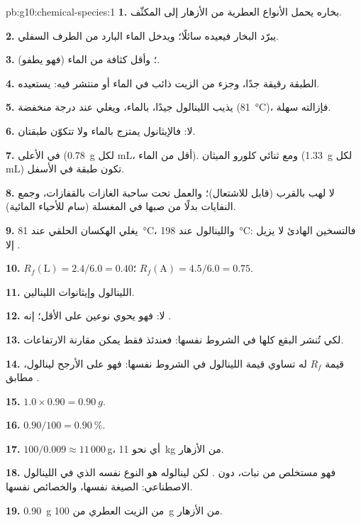 \begin{solution}{pb:g10:chemical-species:1}
\textbf{1.} بخاره يحمل الأنواع العطرية من الأزهار إلى
المكثّف.

\textbf{2.} يبرّد البخار فيعيده سائلًا؛ ويدخل الماء البارد من الطرف
السفلي.

\textbf{3.} ؛ وأقل كثافة من الماء (فهو يطفو).

\textbf{4.} الطبقة رقيقة جدًا، وجزء من الزيت ذائب في الماء أو منتشر فيه:
 يستعيده.

\textbf{5.} يذيب اللينالول جيدًا،  بالماء، ويغلي عند درجة
منخفضة (\qty{81}{\celsius})، فإزالته سهلة.

\textbf{6.} لا: فالإيثانول يمتزج بالماء ولا تتكوّن طبقتان.

\textbf{7.} في الأعلى (\qty{0.78}{g} لكل mL، أقل من الماء). ومع ثنائي
كلورو الميثان (\qty{1.33}{g} لكل mL) تكون طبقة  في
الأسفل.

\textbf{8.} لا لهب بالقرب (قابل للاشتعال)؛ والعمل تحت ساحبة الغازات
بالقفازات، وجمع النفايات بدلًا من صبها في المغسلة (سام للأحياء
المائية).

\textbf{9.} يغلي الهكسان الحلقي عند \qty{81}{\celsius}، واللينالول عند
\qty{198}{\celsius}: فالتسخين الهادئ لا يزيل إلا .

\textbf{10.} $R_f(\text{L}) = 2.4/6.0 = 0.40$؛ $R_f(\text{A}) = 4.5/6.0
= 0.75$.

\textbf{11.} اللينالول وإيثانوات اللينالين.

\textbf{12.} لا: فهو يحوي نوعين على الأقل؛ إنه .

\textbf{13.} لكي تُنشر البقع كلها في الشروط نفسها: فعندئذ فقط يمكن مقارنة
الارتفاعات.

\textbf{14.} قيمة $R_f$ له تساوي قيمة اللينالول في الشروط نفسها: فهو على
الأرجح لينالول، مطابق .

\textbf{15.} $1.0 \times 0.90 = \qty{0.90}{g}$.

\textbf{16.} $0.90/100 = \qty{0.90}{\percent}$.

\textbf{17.} $100/0.009 \approx 11\,000$\,g، أي نحو \qty{11}{kg} من
الأزهار.

\textbf{18.} فهو مستخلص من نبات، دون . لكن لينالوله هو النوع
نفسه الذي في اللينالول الاصطناعي: الصيغة نفسها، والخصائص نفسها.

\textbf{19.} \qty{0.90}{g} من الزيت العطري من \qty{100}{g} من الأزهار.
\end{solution}
